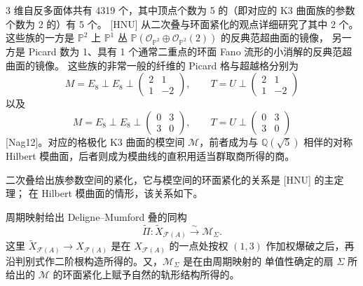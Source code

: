 3 维自反多面体共有 4319 个，其中顶点个数为 5 的（即对应的 K3 曲面族的参数个数为 2 的）有 5 个。
[HNU] 从二次叠与环面紧化的观点详细研究了其中 2 个。
这些族的一方是 $\mathbb{P}^{2}$ 上 $\mathbb{P}^{1}$ 丛
$\mathbb{P}(\mathcal{O}_{\mathbb{P}^{2}}\oplus\mathcal{O}_{\mathbb{P}^{2}}(2))$ 的反典范超曲面的镜像，
另一方是 Picard 数为 1、具有 1 个通常二重点的环面 Fano 流形的小消解的反典范超曲面的镜像。
这些族的非常一般的纤维的 Picard 格与超越格分别为
\begin{equation}
  M=E_{8}\perp E_{8}\perp\begin{pmatrix}2&1\\1&-2\end{pmatrix},\qquad
  T=U\perp\begin{pmatrix}2&1\\1&-2\end{pmatrix} \tag{8.1}
\end{equation}
以及
\begin{equation}
  M=E_{8}\perp E_{8}\perp\begin{pmatrix}0&3\\3&0\end{pmatrix},\qquad
  T=U\perp\begin{pmatrix}0&3\\3&0\end{pmatrix} \tag{8.2}
\end{equation}
[Nag12]。对应的格极化 K3 曲面的模空间 $\mathcal{M}$，前者成为与 $\mathbb{Q}(\sqrt{5})$
相伴的对称 Hilbert 模曲面，后者则成为模曲线的直积用适当群取商所得的商。


二次叠给出族参数空间的紧化，它与模空间的环面紧化的关系是 [HNU] 的主定理；
在 Hilbert 模曲面的情形，该关系如下。

\begin{theorem}
周期映射给出 Deligne–Mumford 叠的同构
\begin{equation}
  \tilde{\Pi}\colon\tilde{X}_{\mathcal{F}(A)}\xrightarrow{\sim}\mathcal{M}_{\Sigma}. \tag{8.3}
\end{equation}
这里 $\tilde{X}_{\mathcal{F}(A)}\to X_{\mathcal{F}(A)}$ 是在 $X_{\mathcal{F}(A)}$ 的一点处按权 $(1,3)$
作加权爆破之后，再沿判别式作二阶根构造所得的。又，$\mathcal{M}_{\Sigma}$ 是在由周期映射的
单值性确定的扇 $\Sigma$ 所给出的 $\mathcal{M}$ 的环面紧化上赋予自然的轨形结构所得的。
\end{theorem}

